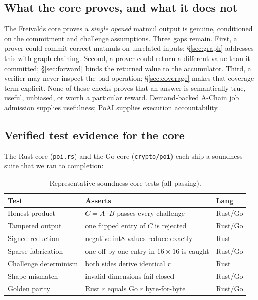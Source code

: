 \documentclass[11pt,a4paper]{article}
\begin{document}
\subsection{What the core proves, and what it does not}

The Freivalds core proves a \emph{single opened} matmul output is genuine, conditioned on the commitment and challenge assumptions. Three gaps remain. First, a prover could commit correct matmuls on unrelated inputs; \S\ref{sec:graph} addresses this with graph chaining. Second, a prover could return a different value than it committed; \S\ref{sec:forward} binds the returned value to the accumulator. Third, a verifier may never inspect the bad operation; \S\ref{sec:coverage} makes that coverage term explicit. None of these checks proves that an answer is semantically true, useful, unbiased, or worth a particular reward. Demand-backed A-Chain job admission supplies usefulness; PoAI supplies execution accountability.

\subsection{Verified test evidence for the core}\label{sec:core-tests}

The Rust core (\texttt{poi.rs}) and the Go core (\texttt{crypto/poi}) each ship a soundness suite that we ran to completion:

\begin{table}[h]
\centering
\begin{tabular}{p{}p{}l}
\toprule
\textbf{Test} & \textbf{Asserts} & \textbf{Lang} \\
\midrule
Honest product & $C = A\!\cdot\!B$ passes every challenge & Rust/Go \\
Tampered output & one flipped entry of $C$ is rejected & Rust/Go \\
Signed reduction & negative int8 values reduce exactly & Rust \\
Sparse fabrication & one off-by-one entry in $16\!\times\!16$ is caught & Rust/Go \\
Challenge determinism & both sides derive identical $r$ & Rust \\
Shape mismatch & invalid dimensions fail closed & Rust/Go \\
Golden parity & Rust $r$ equals Go $r$ byte-for-byte & Rust/Go \\
\bottomrule
\end{tabular}
\caption{Representative soundness-core tests (all passing).}
\end{table}
\end{document}

